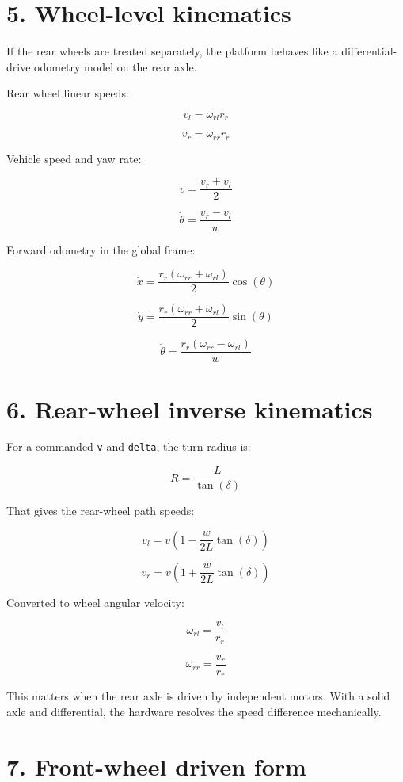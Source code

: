 \documentclass[12pt,a4paper,oneside]{report}
\begin{document}
\section{5. Wheel-level kinematics}\label{wheel-level-kinematics}

If the rear wheels are treated separately, the platform behaves like a
differential-drive odometry model on the rear axle.

Rear wheel linear speeds:

\[
v_l = \omega_{rl} r_r
\]

\[
v_r = \omega_{rr} r_r
\]

Vehicle speed and yaw rate:

\[
v = \frac{v_r + v_l}{2}
\]

\[
\dot{\theta} = \frac{v_r - v_l}{w}
\]

Forward odometry in the global frame:

\[
\dot{x} = \frac{r_r(\omega_{rr} + \omega_{rl})}{2}\cos(\theta)
\]

\[
\dot{y} = \frac{r_r(\omega_{rr} + \omega_{rl})}{2}\sin(\theta)
\]

\[
\dot{\theta} = \frac{r_r(\omega_{rr} - \omega_{rl})}{w}
\]

\section{6. Rear-wheel inverse kinematics}\label{rear-wheel-inverse-kinematics}

For a commanded \texttt{v} and \texttt{delta}, the turn radius is:

\[
R = \frac{L}{\tan(\delta)}
\]

That gives the rear-wheel path speeds:

\[
v_l = v \left(1 - \frac{w}{2L}\tan(\delta)\right)
\]

\[
v_r = v \left(1 + \frac{w}{2L}\tan(\delta)\right)
\]

Converted to wheel angular velocity:

\[
\omega_{rl} = \frac{v_l}{r_r}
\]

\[
\omega_{rr} = \frac{v_r}{r_r}
\]

This matters when the rear axle is driven by independent motors. With a solid
axle and differential, the hardware resolves the speed difference mechanically.

\section{7. Front-wheel driven form}\label{front-wheel-driven-form}
\end{document}
